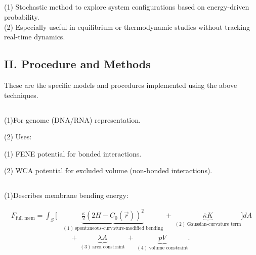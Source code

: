 \documentclass[12pt]{article}
\begin{document}
\begin{flushleft}
\subsection*{}
\begin{tabbing}

  \indent\indent    (1) Stochastic method to explore system configurations based on energy-driven probability.\\

    \indent\indent (2) Especially useful in equilibrium or thermodynamic studies without tracking real-time dynamics.
\end{tabbing}



\subsection*{II. Procedure and Methods} 


These are the specific models and procedures implemented using the above techniques.\\


  \subsection*{}

     \indent\indent  (1)For genome (DNA/RNA) representation.

      \indent\indent (2) Uses:

         \indent\indent \indent (1) FENE potential for bonded interactions.

          \indent\indent \indent   (2) WCA potential for excluded volume (non-bonded interactions).

  \subsection*{}

  	 \indent\indent(1)Describes membrane bending energy:

\vspace{-1em}
\begin{align}
F_\text{full mem} = \int_S \Bigg[
&\underbrace{\frac{\kappa}{2} \left(2H - C_0(\vec{r}) \right)^2}_{(1)\ \text{spontaneous-curvature-modified bending}} 
\ + \ 
\underbrace{\bar{\kappa} K}_{(2)\ \text{Gaussian-curvature term}} 
\Bigg] dA \nonumber \\
&\quad + \ 
\underbrace{\lambda A}_{(3)\ \text{area constraint}} 
\ + \ 
\underbrace{p V}_{(4)\ \text{volume constraint}}.
\end{align}


\end{flushleft}
\end{document}
